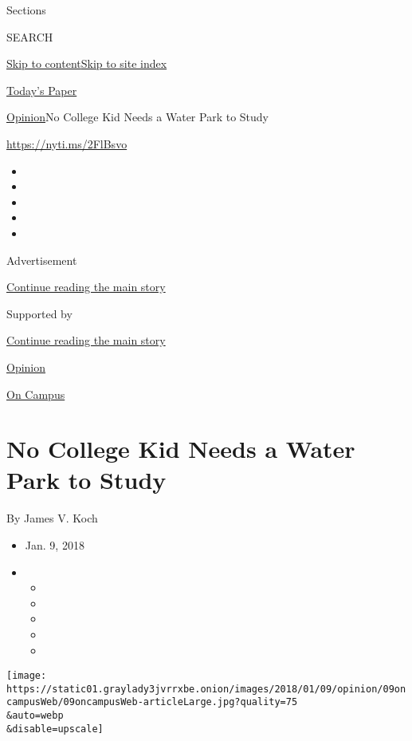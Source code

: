 Sections

SEARCH

\protect\hyperlink{site-content}{Skip to
content}\protect\hyperlink{site-index}{Skip to site index}

\href{https://myaccount.nytimes3xbfgragh.onion/auth/login?response_type=cookie\&client_id=vi}{}

\href{https://www.nytimes3xbfgragh.onion/section/todayspaper}{Today's
Paper}

\href{/section/opinion}{Opinion}\textbar{}No College Kid Needs a Water
Park to Study

\url{https://nyti.ms/2FlBsvo}

\begin{itemize}
\item
\item
\item
\item
\item
\end{itemize}

Advertisement

\protect\hyperlink{after-top}{Continue reading the main story}

Supported by

\protect\hyperlink{after-sponsor}{Continue reading the main story}

\href{/section/opinion}{Opinion}

\href{/column/on-campus}{On Campus}

\hypertarget{no-college-kid-needs-a-water-park-to-study}{%
\section{No College Kid Needs a Water Park to
Study}\label{no-college-kid-needs-a-water-park-to-study}}

By James V. Koch

\begin{itemize}
\item
  Jan. 9, 2018
\item
  \begin{itemize}
  \item
  \item
  \item
  \item
  \item
  \end{itemize}
\end{itemize}

\texttt{[image: https://static01.graylady3jvrrxbe.onion/images/2018/01/09/opinion/09oncampusWeb/09oncampusWeb-articleLarge.jpg?quality=75\\\&auto=webp\\\&disable=upscale]}

